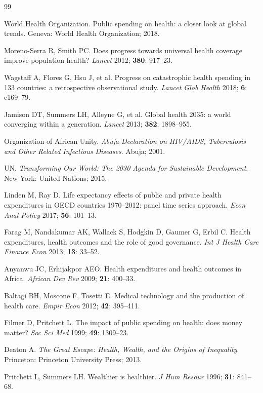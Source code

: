 \documentclass[12pt,a4paper]{article}
\begin{document}
\begin{thebibliography}{99}

 World Health Organization. Public spending on health: a closer look at global trends. Geneva: World Health Organization; 2018.

 Moreno-Serra R, Smith PC. Does progress towards universal health
coverage improve population health? \textit{Lancet} 2012; \textbf{380}: 917--23.

 Wagstaff A, Flores G, Hsu J, et al. Progress on catastrophic health
spending in 133 countries: a retrospective observational study. \textit{Lancet
Glob Health} 2018; \textbf{6}: e169--79.

 Jamison DT, Summers LH, Alleyne G, et al. Global health 2035: a
world converging within a generation. \textit{Lancet} 2013; \textbf{382}:
1898--955.

 Organization of African Unity. \textit{Abuja Declaration on
HIV/AIDS, Tuberculosis and Other Related Infectious Diseases}. Abuja; 2001.

 UN. \textit{Transforming Our World: The 2030 Agenda for Sustainable
Development}. New York: United Nations; 2015.

 Linden M, Ray D. Life expectancy effects of public and private
health expenditures in OECD countries 1970--2012: panel time series approach.
\textit{Econ Anal Policy} 2017; \textbf{56}: 101--13.

 Farag M, Nandakumar AK, Wallack S, Hodgkin D, Gaumer G, Erbil C.
Health expenditures, health outcomes and the role of good governance.
\textit{Int J Health Care Finance Econ} 2013; \textbf{13}: 33--52.

 Anyanwu JC, Erhijakpor AEO. Health expenditures and health
outcomes in Africa. \textit{African Dev Rev} 2009; \textbf{21}: 400--33.

 Baltagi BH, Moscone F, Tosetti E. Medical technology and the
production of health care. \textit{Empir Econ} 2012; \textbf{42}: 395--411.

 Filmer D, Pritchett L. The impact of public spending on health:
does money matter? \textit{Soc Sci Med} 1999; \textbf{49}: 1309--23.

 Deaton A. \textit{The Great Escape: Health, Wealth, and the
Origins of Inequality}. Princeton: Princeton University Press; 2013.

 Pritchett L, Summers LH. Wealthier is healthier. \textit{J Hum
Resour} 1996; \textbf{31}: 841--68.


\end{thebibliography}
\end{document}
